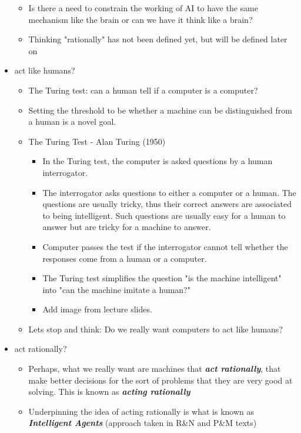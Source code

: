 \documentclass[12pt]{article}
\begin{document}
\begin{itemize}
\begin{itemize}
        \item Is there a need to constrain the working of AI to have the same mechanism like the brain or can we have it think like a brain?
        \item Thinking "rationally" has not been defined yet, but will be defined later on
    \end{itemize}
    \item act like humans?
    \begin{itemize}
        \item The Turing test: can a human tell if a computer is a computer?
        \item Setting the threshold to be whether a machine can be distinguished from a human is a novel goal.
        \item The Turing Test - Alan Turing (1950) 
        \begin{itemize}
            \item In the Turing test, the computer is asked questions by a human interrogator. 
            \item The interrogator asks questions to either a computer or a human. The questions are usually tricky, thus their correct answers are associated to being intelligent. Such questions are usually easy for a human to answer but are tricky for a machine to answer.
            \item Computer passes the test if the interrogator cannot tell whether the responses come from a human or a computer.
            \item The Turing test simplifies the question "is the machine intelligent" into "can the machine imitate a human?"
            \item Add image from lecture slides.
        \end{itemize}
        \item Lets stop and think: Do we really want computers to act like humans?
    \end{itemize}
    \item act rationally?
    \begin{itemize}
        \item Perhaps, what we really want are machines that \textbf{\emph{act rationally}}, that make better decisions for the sort of problems that they are very good at solving. This is known as \textbf{\emph{acting rationally}}
        \item Underpinning the idea of acting rationally is what is known as \textbf{\emph{Intelligent Agents}} (approach taken in R\&N and P\&M texts)

\end{itemize}
\end{itemize}
\end{document}
